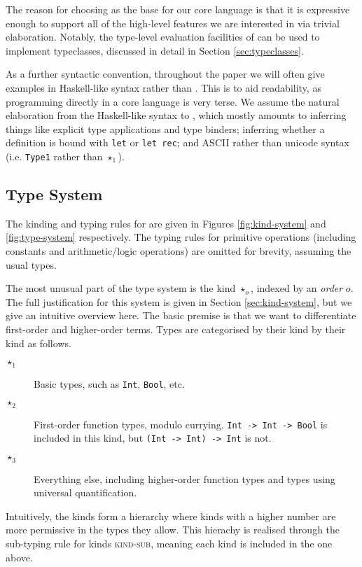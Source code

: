 \documentclass[runningheads]{llncs}
\begin{document}
The reason for choosing \fom{} as the base for our core language is that it is expressive enough to support all of the high-level features we are interested in via trivial elaboration. Notably, the type-level evaluation facilities of \fom{} can be used to implement typeclasses, discussed in detail in Section \ref{sec:typeclasses}.

As a further syntactic convention, throughout the paper we will often give examples in Haskell-like syntax rather than \core{}. This is to aid readability, as programming directly in a core language is very terse. We assume the natural elaboration from the Haskell-like syntax to \core{}, which mostly amounts to inferring things like explicit type applications and type binders; inferring whether a definition is bound with \texttt{let} or \texttt{let rec}; and ASCII rather than unicode syntax (i.e. \texttt{Type1} rather than $\star_1$).


\subsection{Type System}

The kinding and typing rules for \core{} are given in Figures \ref{fig:kind-system} and \ref{fig:type-system} respectively. The typing rules for primitive operations (including constants and arithmetic/logic operations) are omitted for brevity, assuming the usual types.



The most unusual part of the type system is the kind $\star_o$, indexed by an \textit{order} $o$. The full justification for this system is given in Section \ref{sec:kind-system}, but we give an intuitive overview here. The basic premise is that we want to differentiate first-order and higher-order terms. Types are categorised by their kind by their kind as follows.

\begin{description}
   \item[$\star_1$] Basic types, such as \texttt{Int}, \texttt{Bool}, etc.
   \item[$\star_2$] First-order function types, modulo currying. \texttt{Int -> Int -> Bool} is included in this kind, but \texttt{(Int -> Int) -> Int} is not.
   \item[$\star_3$] Everything else, including higher-order function types and types using universal quantification.
\end{description}

Intuitively, the kinds form a hierarchy where kinds with a higher number are more permissive in the types they allow. This hierachy is realised through the sub-typing rule for kinds \textsc{kind-sub}, meaning each kind is included in the one above.
\end{document}
